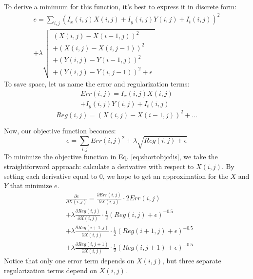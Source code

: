\documentclass[10pt,twocolumn,letterpaper]{article}
\begin{document}
To derive a minimum for this function, it's best to express it in discrete form:
\begin{multline} \label{eq:objectivecDiscrete}
e = \sum_{i,j} (I_x(i, j) X(i, j) + I_y(i, j) Y(i, j) + I_t(i, j))^2 \\
+ \lambda \sqrt{
\begin{array}{c}
(X(i, j) - X(i-1, j))^2 \\
+ (X(i,j) - X(i,j-1))^2 \\
+ (Y(i,j) - Y(i-1, j))^2 \\
+ (Y(i,j) - Y(i,j-1))^2 + \epsilon
\end{array}
}
\end{multline}
To save space, let us name the error and regularization terms:
\begin{multline} \label{eq:errorTerm}
Err(i, j) = I_x(i, j) X(i, j) \\
+ I_y(i, j) Y(i, j) + I_t(i, j)
\end{multline}
\begin{equation} \label{eq:regTerm}
Reg(i,j) = (X(i,j) - X(i-1,j))^2 + ...
\end{equation}

Now, our objective function becomes:
\begin{equation} \label{eq:shortobjcdis}
e = \sum_{i,j} Err(i,j)^2 + \lambda \sqrt{Reg(i,j) + \epsilon }
\end{equation}
To minimize the objective function in Eq. \ref{eq:shortobjcdis}, we take the straightforward approach: calculate a derivative with respect to $X(i, j)$.  By setting each derivative equal to $0$, we hope to get an approximation for the $X$ and $Y$ that minimize $e$.
\begin{equation}
\begin{aligned}
&\frac{\partial e}{\partial X(i, j)} = \frac{\partial Err(i,j)}{\partial X(i, j)} \cdot 2 Err(i, j) \\
&+ \lambda \frac{\partial Reg(i,j)}{\partial X(i, j)} \cdot \frac{1}{2} (Reg(i, j) + \epsilon)^{-0.5}  \\
&+ \lambda \frac{\partial Reg(i+1,j)}{\partial X(i, j)} \cdot \frac{1}{2} (Reg(i+1, j) + \epsilon)^{-0.5}  \\
&+ \lambda \frac{\partial Reg(i,j+1)}{\partial X(i, j)} \cdot \frac{1}{2} (Reg(i, j+1) + \epsilon)^{-0.5}
\end{aligned}
\label{eq:dedx}
\end{equation}
Notice that only one error term depends on $X(i, j)$, but three separate regularization terms depend on $X(i, j)$.
\end{document}
